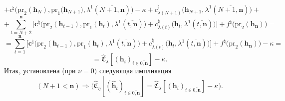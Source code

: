 \documentclass[12pt]{report}
\newcommand{\bfn}{\begin{equation}}
\newcommand{\efn}{\end{equation}}
\newcommand{\ov}{\overline}
\newcommand{\la}{\lambda}
\newcommand{\nn}{{\mathbf n}}
\begin{document}
{{$$$$
$$
+ c^\natural\bigl(\mathrm{pr}_2(\mathbf{h}_N),\mathrm{pr}_1\bigl(\mathbf{h}_{N+1}),
\la^1(\ov{N+1,\mathbf{n}})\bigl) - \kappa +
c_{\la(N+1)}^\natural\bigl(\mathbf{h}_{N+1},\la^1(\ov{N+1,\nn})\bigl)+ $$
$$
+ \sum\limits_{t=N+2}^\mathbf{n}\bigl[\mathbf{c}^\natural\bigl(\mathrm{pr}_2(\mathbf{h}_{t-1}),
\mathrm{pr}_1(\mathbf{h}_t),\la^1(\ov{t,\mathbf{n}})\bigl) + c_{\la(t)}^\natural\bigl(\mathbf{h}_t,
\la^1(\ov{t,\mathbf{n}})\bigl)\bigl] + f^\natural\bigl(\mathrm{pr}_2(\mathbf{h}_\mathbf{n})\bigl) =
$$
$$
= \sum\limits_{t=1}^\mathbf{n}\bigl[\mathbf{c}^\natural\bigl(\mathrm{pr}_2(\mathbf{h}_{t-1}),
\mathrm{pr}_1(\mathbf{h}_t),\la^1(\ov{t,\mathbf{n}})\bigl) +
c_{\la(t)}^\natural\bigl(\mathbf{h}_t,\la^1(\ov{t,\mathbf{n}})\bigl)\bigl] +
f^\natural\bigl(\mathrm{pr}_2(\mathbf{h}_\mathbf{n})\bigl) -\kappa =
$$
$$
= \widehat{\mathfrak{C}}_\la[(\mathbf{h}_i)_{i\in\ov{0,\mathbf{n}}}] - \kappa.
$$
Итак, установлена (при $\nu =0)$ следующая импликация
\bfn\label{4.5.49}
(N+1 < \mathbf{n}) \Longrightarrow \bigl(\widehat{\mathfrak{C}}_\eta[(\hat{\mathbf{h}}_t)_{t\in \ov{0,\mathbf{n}}}] =
\widehat{\mathfrak{C}}_\la[(\mathbf{h}_i)_{i\in \ov{0,\mathbf{n}}}] - \kappa\bigl).
\efn

}}
\end{document}
